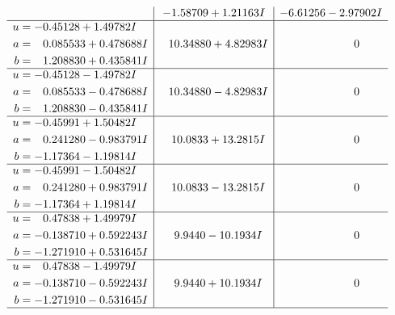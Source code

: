 \documentclass[1p]{elsarticle_modified}
\theoremstyle{definition}
\begin{document}
$$\begin{array}{c|c|c}
 & -1.58709 + 1.21163 I & -6.61256 - 2.97902 I \\ \hline\begin{aligned}
u &= -0.45128 + 1.49782 I \\
a &= \phantom{-}0.085533 + 0.478688 I \\
b &= \phantom{-}1.208830 + 0.435841 I\end{aligned}
 & \phantom{-}10.34880 + 4.82983 I & \phantom{-0.000000 } 0 \\ \hline\begin{aligned}
u &= -0.45128 - 1.49782 I \\
a &= \phantom{-}0.085533 - 0.478688 I \\
b &= \phantom{-}1.208830 - 0.435841 I\end{aligned}
 & \phantom{-}10.34880 - 4.82983 I & \phantom{-0.000000 } 0 \\ \hline\begin{aligned}
u &= -0.45991 + 1.50482 I \\
a &= \phantom{-}0.241280 - 0.983791 I \\
b &= -1.17364 - 1.19814 I\end{aligned}
 & \phantom{-}10.0833 + 13.2815 I & \phantom{-0.000000 } 0 \\ \hline\begin{aligned}
u &= -0.45991 - 1.50482 I \\
a &= \phantom{-}0.241280 + 0.983791 I \\
b &= -1.17364 + 1.19814 I\end{aligned}
 & \phantom{-}10.0833 - 13.2815 I & \phantom{-0.000000 } 0 \\ \hline\begin{aligned}
u &= \phantom{-}0.47838 + 1.49979 I \\
a &= -0.138710 + 0.592243 I \\
b &= -1.271910 + 0.531645 I\end{aligned}
 & \phantom{-}9.9440 - 10.1934 I & \phantom{-0.000000 } 0 \\ \hline\begin{aligned}
u &= \phantom{-}0.47838 - 1.49979 I \\
a &= -0.138710 - 0.592243 I \\
b &= -1.271910 - 0.531645 I\end{aligned}
 & \phantom{-}9.9440 + 10.1934 I & \phantom{-0.000000 } 0\\
 \hline 
 \end{array}$$\newpage$$\begin{array}{c|c|c}  

\end{array}$$
\end{document}
